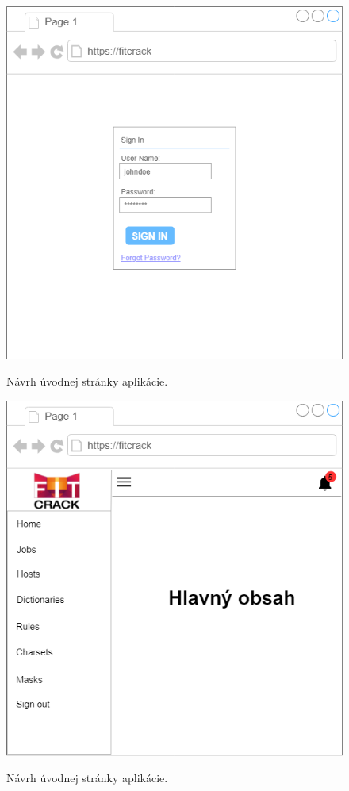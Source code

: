 \documentclass[zadani,slovak]{fitthesis}
\begin{document}
\begin{figure}[h]
\centering
\begin{minipage}{.5\textwidth}
    \centering
    \includegraphics[width=0.95\linewidth]{obrazky/loginscreen.png}
    \caption{Návrh úvodnej stránky aplikácie.}
    \label{fig:loginScreen}
\end{minipage}%
\begin{minipage}{.5\textwidth}
    \centering
    \includegraphics[width=0.95\linewidth]{obrazky/mainPage.png}
    \caption{Návrh úvodnej stránky aplikácie.}
    \label{fig:mainPage}\label{fig:mainPage}
\end{minipage}
\end{figure}
\end{document}
